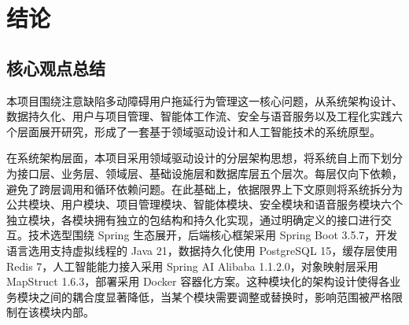 \clearpage

\section{结论}

%


\subsection{核心观点总结}

\par 本项目围绕注意缺陷多动障碍用户拖延行为管理这一核心问题，从系统架构设计、数据持久化、用户与项目管理、智能体工作流、安全与语音服务以及工程化实践六个层面展开研究，形成了一套基于领域驱动设计和人工智能技术的系统原型。

\par 在系统架构层面，本项目采用领域驱动设计的分层架构思想，将系统自上而下划分为接口层、业务层、领域层、基础设施层和数据库层五个层次。每层仅向下依赖，避免了跨层调用和循环依赖问题。在此基础上，依据限界上下文原则将系统拆分为公共模块、用户模块、项目管理模块、智能体模块、安全模块和语音服务模块六个独立模块，各模块拥有独立的包结构和持久化实现，通过明确定义的接口进行交互。技术选型围绕 Spring 生态展开，后端核心框架采用 Spring Boot 3.5.7，开发语言选用支持虚拟线程的 Java 21，数据持久化使用 PostgreSQL 15，缓存层使用 Redis 7，人工智能能力接入采用 Spring AI Alibaba 1.1.2.0，对象映射层采用 MapStruct 1.6.3，部署采用 Docker 容器化方案。这种模块化的架构设计使得各业务模块之间的耦合度显著降低，当某个模块需要调整或替换时，影响范围被严格限制在该模块内部。

